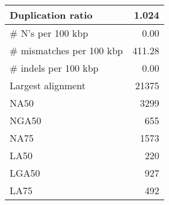 \documentclass[12pt,a4paper]{article}
\begin{document}
\begin{table}[ht]
\begin{center}
\begin{tabular}{|l*{1}{|r}|}
Duplication ratio & 1.024 \\ \hline
\# N's per 100 kbp & 0.00 \\ \hline
\# mismatches per 100 kbp & 411.28 \\ \hline
\# indels per 100 kbp & 0.00 \\ \hline
Largest alignment & 21375 \\ \hline
NA50 & 3299 \\ \hline
NGA50 & 655 \\ \hline
NA75 & 1573 \\ \hline
LA50 & 220 \\ \hline
LGA50 & 927 \\ \hline
LA75 & 492 \\ \hline
\end{tabular}
\end{center}
\end{table}
\end{document}
